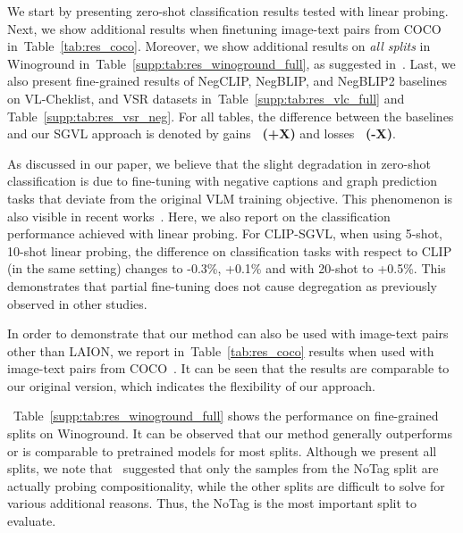 \documentclass[11pt]{article}
\newcommand{\tabref}[1]{Table~\ref{#1}}
\newcommand{\gcol}[1]{{\bf \fontsize{6.5}{42}\selectfont \color{citecolor!80}~(#1)}}
\newcommand{\rcol}[1]{{\bf \fontsize{6.5}{42}\selectfont \color{lightred!180}~(#1)}}
\newcommand\cmr[1]{{#1}}
\begin{document}
We start by presenting zero-shot classification results tested with linear probing. Next, we show additional results when finetuning image-text pairs from COCO in~\tabref{tab:res_coco}. Moreover, we show additional results on \textit{all splits} in Winoground in~\tabref{supp:tab:res_winoground_full}, as suggested in~\citet{Diwan2022WhyIW}. Last, we also present fine-grained results of NegCLIP, NegBLIP, and NegBLIP2 baselines on VL-Cheklist, and VSR datasets in~\tabref{supp:tab:res_vlc_full} and \tabref{supp:tab:res_vsr_neg}. For all tables, the difference between the baselines and our SGVL approach is denoted by gains \gcol{+X} and losses \rcol{-X}. 





\cmr{As discussed in our paper, we believe that the slight degradation in zero-shot classification is due to fine-tuning with negative captions and graph prediction tasks that deviate from the original VLM training objective. This phenomenon is also visible in recent works~\cite{doveh2022teaching,yuksekgonul2023when}. Here, we also report on the classification performance achieved with linear probing. For CLIP-SGVL, when using 5-shot, 10-shot linear probing, the difference on classification tasks with respect to CLIP (in the same setting) changes to -0.3\%, +0.1\% and with 20-shot to +0.5\%. This demonstrates that partial fine-tuning does not cause degregation as previously observed in other studies.}

\cmr{In order to demonstrate that our method can also be used with image-text pairs other than LAION, we report in~\tabref{tab:res_coco} results when used with image-text pairs from COCO~\cite{Lin2014MSCOCO}. It can be seen that the results are comparable to our original version, which indicates the flexibility of our approach.}





~\tabref{supp:tab:res_winoground_full} shows the performance on fine-grained splits on Winoground. It can be observed that our method generally outperforms or is comparable to pretrained models for most splits. Although we present all splits, we note that~\citet{Diwan2022WhyIW} suggested that only the samples from the NoTag split are actually probing compositionality, while the other splits are difficult to solve for various additional reasons. Thus, the NoTag is the most important split to evaluate.
\end{document}
